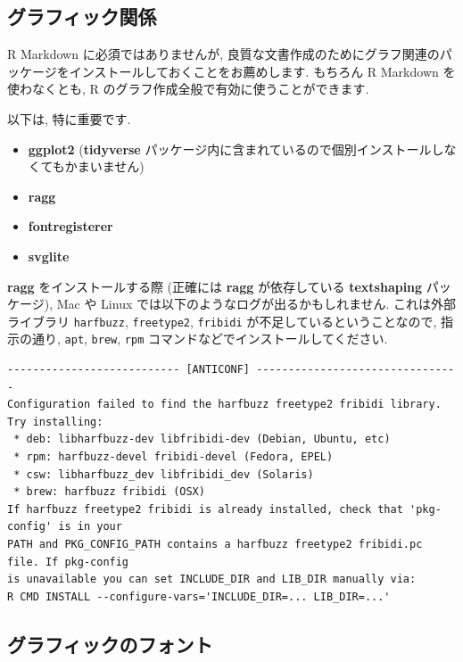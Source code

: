 \documentclass[
]{bxjsarticle}
\providecommand{\tightlist}{%
  \setlength{\itemsep}{0pt}\setlength{\parskip}{0pt}}
\begin{document}
\hypertarget{ux30b0ux30e9ux30d5ux30a3ux30c3ux30afux95a2ux4fc2}{%
\subsection{グラフィック関係}\label{ux30b0ux30e9ux30d5ux30a3ux30c3ux30afux95a2ux4fc2}}

R Markdown に必須ではありませんが, 良質な文書作成のためにグラフ関連のパッケージをインストールしておくことをお薦めします. もちろん R Markdown を使わなくとも, R のグラフ作成全般で有効に使うことができます.

以下は, 特に重要です.

\begin{itemize}
\tightlist
\item
  \textbf{ggplot2} (\textbf{tidyverse} パッケージ内に含まれているので個別インストールしなくてもかまいません)
\item
  \textbf{ragg}
\item
  \textbf{fontregisterer}
\item
  \textbf{svglite}
\end{itemize}

\textbf{ragg} をインストールする際 (正確には \textbf{ragg} が依存している \textbf{textshaping} パッケージ), Mac や Linux では以下のようなログが出るかもしれません. これは外部ライブラリ \texttt{harfbuzz}, \texttt{freetype2}, \texttt{fribidi} が不足しているということなので, 指示の通り, \texttt{apt}, \texttt{brew}, \texttt{rpm} コマンドなどでインストールしてください.

\begin{verbatim}
--------------------------- [ANTICONF] --------------------------------
Configuration failed to find the harfbuzz freetype2 fribidi library. Try installing:
 * deb: libharfbuzz-dev libfribidi-dev (Debian, Ubuntu, etc)
 * rpm: harfbuzz-devel fribidi-devel (Fedora, EPEL)
 * csw: libharfbuzz_dev libfribidi_dev (Solaris)
 * brew: harfbuzz fribidi (OSX)
If harfbuzz freetype2 fribidi is already installed, check that 'pkg-config' is in your
PATH and PKG_CONFIG_PATH contains a harfbuzz freetype2 fribidi.pc file. If pkg-config
is unavailable you can set INCLUDE_DIR and LIB_DIR manually via:
R CMD INSTALL --configure-vars='INCLUDE_DIR=... LIB_DIR=...'
\end{verbatim}

\hypertarget{ux30b0ux30e9ux30d5ux30a3ux30c3ux30afux306eux30d5ux30a9ux30f3ux30c8}{%
\subsection{グラフィックのフォント}\label{ux30b0ux30e9ux30d5ux30a3ux30c3ux30afux306eux30d5ux30a9ux30f3ux30c8}}
\end{document}
